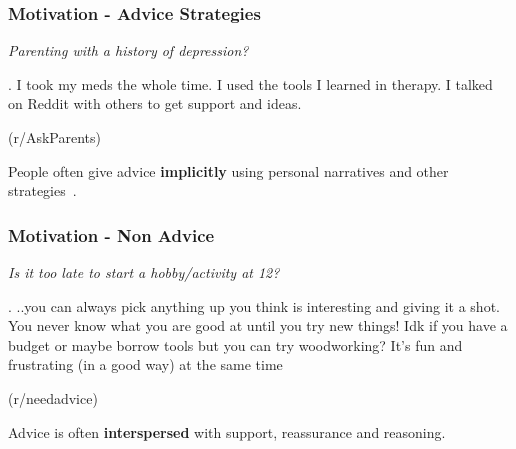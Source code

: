\begin{frame}[c]\frametitle{Motivation - Advice Strategies}

\pause

\begin{center}
\vfill \itshape \large Parenting with a history of depression?
\end{center}

\ex. \label{ex:2} \vfill \alert<3->{I took} my meds the whole time. \alert<3->{I used} the tools I learned in therapy. \alert<3->{I talked} on Reddit with others to get support and ideas.

\qquad \qquad \qquad \qquad \qquad \qquad \qquad \qquad \qquad \qquad \qquad \qquad (r/AskParents)

\pause

\vfill People often give advice \textbf{implicitly} using personal narratives and other strategies~\citep{abolfathiasl2013pragmatic}.

\end{frame}


\begin{frame}[c]\frametitle{Motivation - Non Advice}

\pause

\begin{center}
\vfill \itshape \large Is it too late to start a hobby/activity at 12?
\end{center}

\ex. \label{ex:1}  \vfill ..\alert<3->{you can always pick anything up you think is interesting and giving it a shot}. You never know what you are good at until you try new things! \alert<3->{Idk if you have a budget or maybe borrow tools but you can try woodworking?} It’s fun and frustrating (in a good way) at the same time

\qquad \qquad \qquad \qquad \qquad \qquad \qquad \qquad \qquad \qquad \qquad \qquad (r/needadvice)

\pause

\vfill Advice is often \textbf{interspersed} with support, reassurance and reasoning.

\end{frame}

